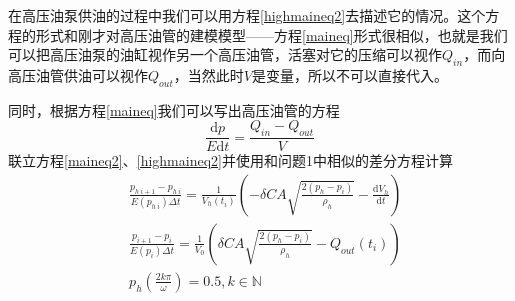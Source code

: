 \documentclass[12pt,AutoFakeBold]{article}%
\newcommand{\dif}{\mathrm{d}}
\begin{document}
    在高压油泵供油的过程中我们可以用方程\ref{highmaineq2}去描述它的情况。这个方程的形式和刚才对高压油管的建模模型——方程\ref{maineq}形式很相似，也就是我们可以把高压油泵的油缸视作另一个高压油管，活塞对它的压缩可以视作$Q_{in}$，而向高压油管供油可以视作$Q_{out}$，当然此时$V$是变量，所以不可以直接代入。\par
    同时，根据方程\ref{maineq}我们可以写出高压油管的方程
    \begin{equation}
        \frac{\dif p}{E\dif t}=\frac{Q_{in}-Q_{out}}{V}
        \label{maineq2}
    \end{equation}
    联立方程\ref{maineq2}、\ref{highmaineq2}并使用和问题1中相似的差分方程计算
    \begin{equation}
        \begin{aligned}
            &\frac{p_{h\ i+1}-p_{h\ i}}{E(p_{h\ i})\Delta t}=\frac{1}{V_h(t_i)}\left(-\delta CA\sqrt{\frac{2\left(p_h-p_i\right)}{\rho_h}}-\frac{\dif V_h}{\dif t}\right)\\
            &\frac{p_{i+1}-p_i}{E(p_i)\Delta t}=\frac{1}{V_0}\left(\delta CA\sqrt{\frac{2\left(p_h-p_i\right)}{\rho_h}}-Q_{out}(t_i)\right)\\
            &p_h(\frac{2k\pi}{\omega})=0.5,k\in\mathbb{N}
        \end{aligned}
    \end{equation}

        
\end{document}
